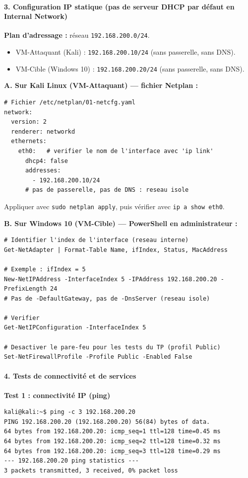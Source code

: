 \documentclass[11pt]{article}
\begin{document}
\begin{exoresolu}
\paragraph{3. Configuration IP statique (pas de serveur DHCP par défaut en Internal Network)}
\textbf{Plan d'adressage :} réseau \texttt{192.168.200.0/24}.
\begin{itemize}
    \item VM-Attaquant (Kali) : \texttt{192.168.200.10/24} (sans passerelle, sans DNS).
    \item VM-Cible (Windows 10) : \texttt{192.168.200.20/24} (sans passerelle, sans DNS).
\end{itemize}

\textbf{A. Sur Kali Linux (VM-Attaquant) — fichier Netplan :}
\begin{lstlisting}
# Fichier /etc/netplan/01-netcfg.yaml
network:
  version: 2
  renderer: networkd
  ethernets:
    eth0:   # verifier le nom de l'interface avec 'ip link'
      dhcp4: false
      addresses:
        - 192.168.200.10/24
      # pas de passerelle, pas de DNS : reseau isole
\end{lstlisting}
Appliquer avec \texttt{sudo netplan apply}, puis vérifier avec \texttt{ip a show eth0}.

\textbf{B. Sur Windows 10 (VM-Cible) — PowerShell en administrateur :}
\begin{lstlisting}
# Identifier l'index de l'interface (reseau interne)
Get-NetAdapter | Format-Table Name, ifIndex, Status, MacAddress

# Exemple : ifIndex = 5
New-NetIPAddress -InterfaceIndex 5 -IPAddress 192.168.200.20 -PrefixLength 24
# Pas de -DefaultGateway, pas de -DnsServer (reseau isole)

# Verifier
Get-NetIPConfiguration -InterfaceIndex 5

# Desactiver le pare-feu pour les tests du TP (profil Public)
Set-NetFirewallProfile -Profile Public -Enabled False
\end{lstlisting}

\paragraph{4. Tests de connectivité et de services}

\textbf{Test 1 : connectivité IP (ping)}
\begin{lstlisting}
kali@kali:~$ ping -c 3 192.168.200.20
PING 192.168.200.20 (192.168.200.20) 56(84) bytes of data.
64 bytes from 192.168.200.20: icmp_seq=1 ttl=128 time=0.45 ms
64 bytes from 192.168.200.20: icmp_seq=2 ttl=128 time=0.32 ms
64 bytes from 192.168.200.20: icmp_seq=3 ttl=128 time=0.29 ms
--- 192.168.200.20 ping statistics ---
3 packets transmitted, 3 received, 0% packet loss
\end{lstlisting}


\end{exoresolu}
\end{document}
